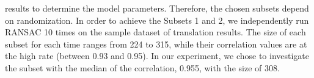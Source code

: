results to determine the model parameters. Therefore, the chosen
subsets depend on randomization. In order to achieve the Subsets 1 and
2, we independently run RANSAC 10 times on the sample dataset of
translation results.
%
The size of each subset for each time ranges from 224 to 315, while their correlation values are at the high rate (between 0.93 and 0.95).
%
In our experiment, we chose to investigate the
subset with the median of the correlation, 0.955, with the
size of 308.
%



%

